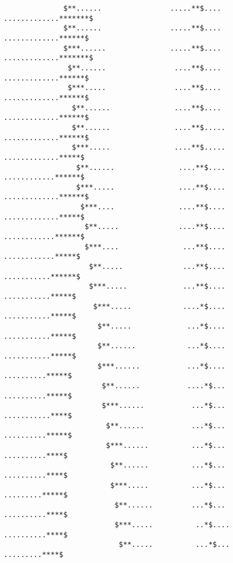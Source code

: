 \begin{verbatim}
              $**......                .....**$....                             .............*******$
              $**......                .....**$....                             .............******$
              $***......               .....**$....                            .............*******$
               $**......                ....**$....                            .............******$
               $***.....                ....**$....                            .............******$
                $**......               ....**$....                           .............******$
                $**......               ....**$.....                          .............******$
                $***.....               ....**$.....                          .............*****$
                 $**......               ....**$....                          ............******$
                 $***.....               ....**$....                         .............******$
                  $***....               ....**$....                         .............*****$
                   $**.....              ....**$....                         ............******$
                   $***....               ...**$....                         ............*****$
                    $**.....              ...**$....                         ...........******$
                    $***.....             ...**$....                         ...........*****$
                     $***.....            ....*$....                         ...........*****$
                      $**.....             ...*$....                        ...........*****$
                      $**......            ...*$....                        ...........*****$
                      $***......           ...*$....                        ..........*****$
                       $**......           ....*$...                        ..........*****$
                       $***......           ...*$...                       ...........****$
                        $**......           ...*$...                       ..........*****$
                        $***......          ...*$...                       ..........****$
                         $**......          ...*$...                       ..........****$
                         $***.....          ...*$...                       .........*****$
                          $**......         ...*$...                      ..........****$
                          $***.....          ..*$....                     ..........****$
                           $**.....          ...*$...                     .........****$

\end{verbatim}
